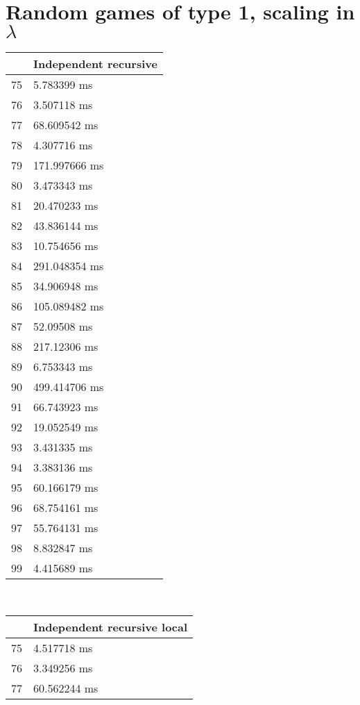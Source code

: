 \section{Random games of type 1, scaling in $\lambda$}
\begin{multicols}{2}
	\begin{tabular}{|l|l|}
		\hline
		& Independent recursive \\ \hline
		75 & 5.783399 ms \\ \hline
		76 & 3.507118 ms \\ \hline
		77 & 68.609542 ms \\ \hline
		78 & 4.307716 ms \\ \hline
		79 & 171.997666 ms \\ \hline
		80 & 3.473343 ms \\ \hline
		81 & 20.470233 ms \\ \hline
		82 & 43.836144 ms \\ \hline
		83 & 10.754656 ms \\ \hline
		84 & 291.048354 ms \\ \hline
		85 & 34.906948 ms \\ \hline
		86 & 105.089482 ms \\ \hline
		87 & 52.09508 ms \\ \hline
		88 & 217.12306 ms \\ \hline
		89 & 6.753343 ms \\ \hline
		90 & 499.414706 ms \\ \hline
		91 & 66.743923 ms \\ \hline
		92 & 19.052549 ms \\ \hline
		93 & 3.431335 ms \\ \hline
		94 & 3.383136 ms \\ \hline
		95 & 60.166179 ms \\ \hline
		96 & 68.754161 ms \\ \hline
		97 & 55.764131 ms \\ \hline
		98 & 8.832847 ms \\ \hline
		99 & 4.415689 ms \\ \hline
	\end{tabular}\\
	\begin{tabular}{|l|l|}
		\hline
		& Independent recursive local \\ \hline
		75 & 4.517718 ms \\ \hline
		76 & 3.349256 ms \\ \hline
		77 & 60.562244 ms \\ \hline

\end{tabular}
\end{multicols}
